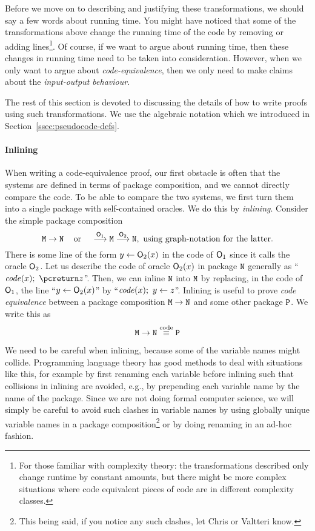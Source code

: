 Before we move on to describing and justifying these transformations, we should say a few words about running time. You might have noticed that some of the transformations above change the running time of the code by removing or adding lines\footnote{For those familiar with complexity theory: the transformations described only change runtime by constant amounts, but there might be more complex situations where code equivalent pieces of code are in different complexity classes.}. Of course, if we want to argue about running time, then these changes in running time need to be taken into consideration. However, when we only want to argue about \emph{code-equivalence}, then we only need to make claims about the \emph{input-output behaviour}.

The rest of this section is devoted to discussing the details of how to write proofs using such transformations. We use the algebraic notation which we introduced in Section~\ref{ssec:pseudocode-defs}.

\paragraph{Inlining}
When writing a code-equivalence proof, our first obstacle is often that the systems are defined in terms of package composition, and we cannot directly compare the code. To be able to compare the two systems, we first turn them into a single package with self-contained oracles. We do this by \emph{inlining}.
Consider the simple package composition
\[\text{\texttt{M}}\rightarrow\text{\texttt{N}}\;\;\;\text{ or }\;\;\;\stackrel{\mathsf{O}_1}{\longrightarrow}\text{\texttt{M}}\stackrel{\mathsf{O}_2}{\longrightarrow}\text{\texttt{N}},\text{
        using graph-notation for the latter.}\]
There is some line of the form $y\gets\mathsf{O}_2(x)$ in the code of $\mathsf{O}_1$ since it calls the oracle $\mathsf{O}_2$.
Let us describe the code of oracle $\mathsf{O}_2(x)$ in package $\text{\texttt{N}}$ generally as ``$\V{code}(x);\ \pcreturn z$''. Then, we can inline $\text{\texttt{N}}$ into $\text{\texttt{M}}$ by replacing, in the code of $\mathsf{O}_1$, the line ``$y\gets\mathsf{O}_2(x)$'' by ``$\mathit{code}(x);\ y\gets z$''. Inlining is useful to prove \emph{code equivalence} between a package composition $\text{\texttt{M}}\rightarrow\text{\texttt{N}}$ and some other package $\text{\texttt{P}}$. We write this as
\[\text{\texttt{M}}\rightarrow\text{\texttt{N}}\stackrel{\text{code}}{\equiv}\text{\texttt{P}}\]

We need to be careful when inlining, because some of the variable names might collide. Programming language theory has good methods to deal with situations like this, for example by first renaming each variable before inlining such that collisions in inlining are avoided, e.g., by
prepending each variable name by the name of the package. Since we are not doing formal computer science, we will simply be careful to avoid such clashes in variable names by using globally unique variable names in a package composition\footnote{This being said, if you notice any such clashes, let Chris or Valtteri know.} or by doing renaming in an ad-hoc fashion.


